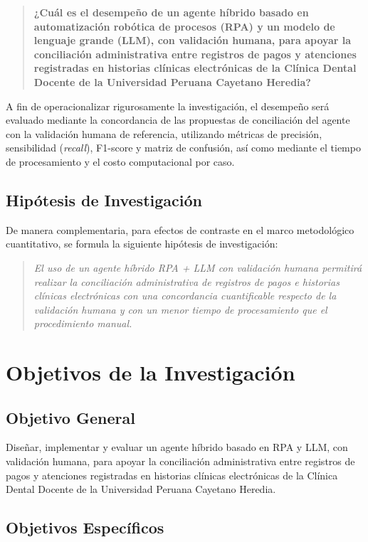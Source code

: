 \begin{quote}
\textbf{¿Cuál es el desempeño de un agente híbrido basado en automatización robótica de procesos (RPA) y un modelo de lenguaje grande (LLM), con validación humana, para apoyar la conciliación administrativa entre registros de pagos y atenciones registradas en historias clínicas electrónicas de la Clínica Dental Docente de la Universidad Peruana Cayetano Heredia?}
\end{quote}

A fin de operacionalizar rigurosamente la investigación, el desempeño será evaluado mediante la concordancia de las propuestas de conciliación del agente con la validación humana de referencia, utilizando métricas de precisión, sensibilidad (\textit{recall}), F1-score y matriz de confusión, así como mediante el tiempo de procesamiento y el costo computacional por caso.

\subsection*{Hipótesis de Investigación}
De manera complementaria, para efectos de contraste en el marco metodológico cuantitativo, se formula la siguiente hipótesis de investigación:
\begin{quote}
\textit{El uso de un agente híbrido RPA + LLM con validación humana permitirá realizar la conciliación administrativa de registros de pagos e historias clínicas electrónicas con una concordancia cuantificable respecto de la validación humana y con un menor tiempo de procesamiento que el procedimiento manual.}
\end{quote}

\section{Objetivos de la Investigación}

\subsection{Objetivo General}

Diseñar, implementar y evaluar un agente híbrido basado en RPA y LLM, con validación humana, para apoyar la conciliación administrativa entre registros de pagos y atenciones registradas en historias clínicas electrónicas de la Clínica Dental Docente de la Universidad Peruana Cayetano Heredia.

\subsection{Objetivos Específicos}

